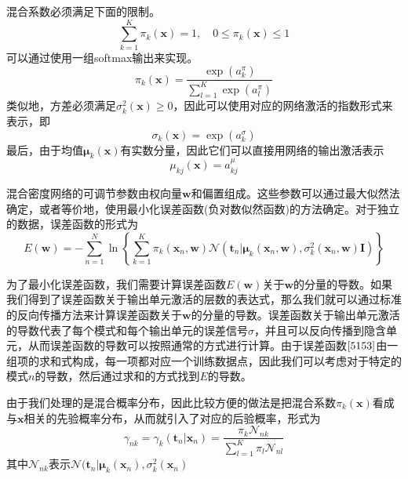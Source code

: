 混合系数必须满足下面的限制。
\begin{equation}
	\sum_{k=1}^{K}\pi_k(\boldsymbol{x})=1,\quad 0\leqslant \pi_k(\boldsymbol{x}) \leqslant 1
\end{equation}
可以通过使用一组softmax输出来实现。
\begin{equation}
	\pi_k(\boldsymbol{x})=\frac{\exp (a_k^{\pi})}{\sum_{l=1}^{K}\exp (a_l^{\pi})}
\end{equation}
类似地，方差必须满足$\sigma_k^2(\boldsymbol{x})\geqslant 0$，因此可以使用对应的网络激活的指数形式来表示，即
\begin{equation}
	\sigma_k(\boldsymbol{x})=\exp (a_k^{\sigma})
\end{equation}
最后，由于均值$\boldsymbol{\mu}_k(\boldsymbol{x})$有实数分量，因此它们可以直接用网络的输出激活表示
\begin{equation}
	\mu_{kj}(\boldsymbol{x})=a_{kj}^{\mu}
\end{equation}

混合密度网络的可调节参数由权向量$\boldsymbol{w}$和偏置组成。这些参数可以通过最大似然法确定，或者等价地，使用最小化误差函数(负对数似然函数)的方法确定。对于独立的数据，误差函数的形式为
\begin{equation}
\label{5153}
	E(\boldsymbol{w})=-\sum_{n=1}^{N}\ln \left\{\sum_{k=1}^{K}\pi_k(\boldsymbol{x}_n,\boldsymbol{w})\mathcal{N}(\boldsymbol{t}_n|\boldsymbol{\mu}_k(\boldsymbol{x}_n,\boldsymbol{w}),\sigma_k^2(\boldsymbol{x}_n,\boldsymbol{w})\boldsymbol{I}) \right\}
\end{equation}

为了最小化误差函数，我们需要计算误差函数$E(\boldsymbol{w})$关于$\boldsymbol{w}$的分量的导数。如果我们得到了误差函数关于输出单元激活的层数的表达式，那么我们就可以通过标准的反向传播方法来计算误差函数关于$\boldsymbol{w}$的分量的导数。误差函数关于输出单元激活的导数代表了每个模式和每个输出单元的误差信号$\sigma$，并且可以反向传播到隐含单元，从而误差函数的导数可以按照通常的方式进行计算。由于误差函数$\ref{5153}$由一组项的求和式构成，每一项都对应一个训练数据点，因此我们可以考虑对于特定的模式$n$的导数，然后通过求和的方式找到$E$的导数。

由于我们处理的是混合概率分布，因此比较方便的做法是把混合系数$\pi_k(\boldsymbol{x})$看成与$\boldsymbol{x}$相关的先验概率分布，从而就引入了对应的后验概率，形式为
\begin{equation}
	\gamma_{nk}=\gamma_{k}(\boldsymbol{t}_n|\boldsymbol{x}_n)=\frac{\pi_k\mathcal{N}_{nk}}{\sum_{l=1}^{K}\pi_l\mathcal{N}_{nl}}
\end{equation}
其中$\mathcal{N}_{nk}$表示$\mathcal{N}(\boldsymbol{t}_n|\boldsymbol{\mu}_k(\boldsymbol{x}_n),\sigma_k^2(\boldsymbol{x}_n)$


